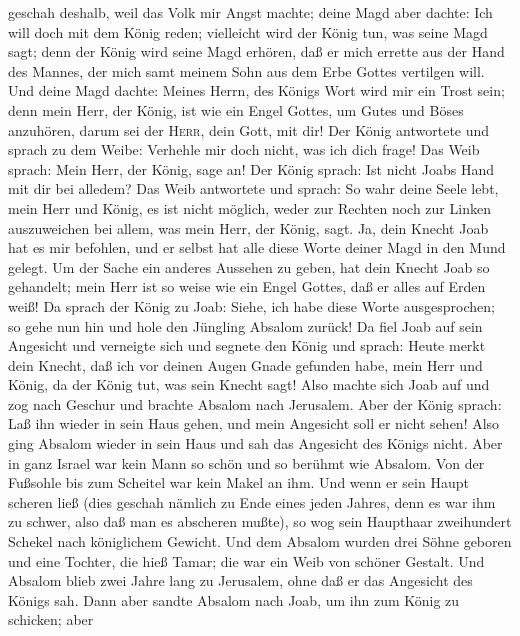 geschah deshalb, weil das Volk mir Angst machte; deine Magd aber dachte:
Ich will doch mit dem König reden; vielleicht wird der König tun, was
seine Magd sagt;  denn der König wird seine Magd erhören,
daß er mich errette aus der Hand des Mannes, der mich samt meinem Sohn
aus dem Erbe Gottes vertilgen will.  Und deine Magd
dachte: Meines Herrn, des Königs Wort wird mir ein Trost sein; denn mein
Herr, der König, ist wie ein Engel Gottes, um Gutes und Böses anzuhören,
darum sei der \textsc{Herr}, dein Gott, mit dir!  Der
König antwortete und sprach zu dem Weibe: Verhehle mir doch nicht, was
ich dich frage! Das Weib sprach: Mein Herr, der König, sage an!
 Der König sprach: Ist nicht Joabs Hand mit dir bei
alledem? Das Weib antwortete und sprach: So wahr deine Seele lebt, mein
Herr und König, es ist nicht möglich, weder zur Rechten noch zur Linken
auszuweichen bei allem, was mein Herr, der König, sagt. Ja, dein Knecht
Joab hat es mir befohlen, und er selbst hat alle diese Worte deiner Magd
in den Mund gelegt.  Um der Sache ein anderes Aussehen zu
geben, hat dein Knecht Joab so gehandelt; mein Herr ist so weise wie ein
Engel Gottes, daß er alles auf Erden weiß!  Da sprach der
König zu Joab: Siehe, ich habe diese Worte ausgesprochen; so gehe nun
hin und hole den Jüngling Absalom zurück!  Da fiel Joab
auf sein Angesicht und verneigte sich und segnete den König und sprach:
Heute merkt dein Knecht, daß ich vor deinen Augen Gnade gefunden habe,
mein Herr und König, da der König tut, was sein Knecht sagt!
 Also machte sich Joab auf und zog nach Geschur und
brachte Absalom nach Jerusalem.  Aber der König sprach:
Laß ihn wieder in sein Haus gehen, und mein Angesicht soll er nicht
sehen! Also ging Absalom wieder in sein Haus und sah das Angesicht des
Königs nicht.  Aber in ganz Israel war kein Mann so schön
und so berühmt wie Absalom. Von der Fußsohle bis zum Scheitel war kein
Makel an ihm.  Und wenn er sein Haupt scheren ließ (dies
geschah nämlich zu Ende eines jeden Jahres, denn es war ihm zu schwer,
also daß man es abscheren mußte), so wog sein Haupthaar zweihundert
Schekel nach königlichem Gewicht.  Und dem Absalom wurden
drei Söhne geboren und eine Tochter, die hieß Tamar; die war ein Weib
von schöner Gestalt.  Und Absalom blieb zwei Jahre lang
zu Jerusalem, ohne daß er das Angesicht des Königs sah. 
Dann aber sandte Absalom nach Joab, um ihn zum König zu schicken; aber
